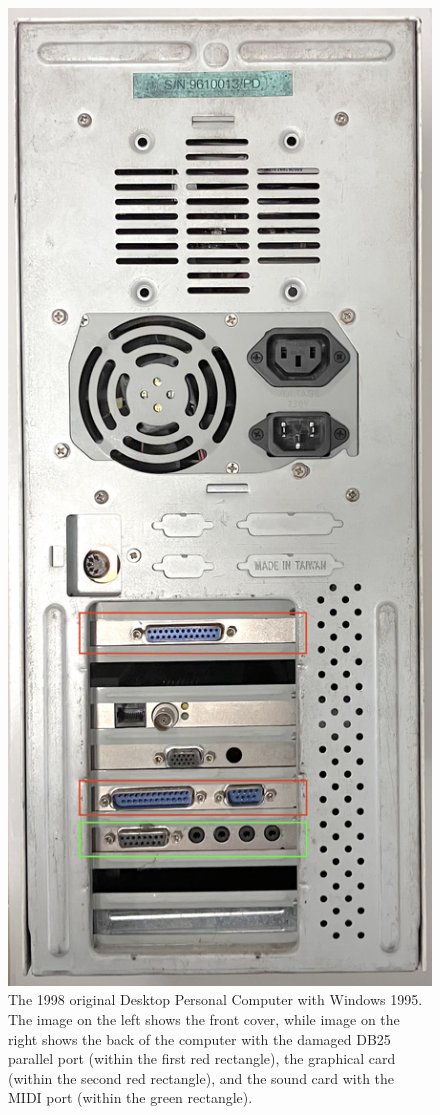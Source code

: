 \begin{figure}[h!]
\begin{minipage}[t]{0.48\textwidth}
        \includegraphics[width=0.75\linewidth]{chapters/appendix/b/image/figb-ilcaosdellesfere-computer01.jpg}
    \end{minipage}
    \caption{The 1998 original Desktop Personal Computer with Windows 1995. The image on the left shows the front cover, while image on the right shows the back of the computer with the damaged DB25 parallel port (within the first red rectangle), the graphical card (within the second red rectangle), and the sound card with the MIDI port (within the green rectangle).}
    \label{fig:ab-ilcaosdellesfere-computer}
\end{figure}
